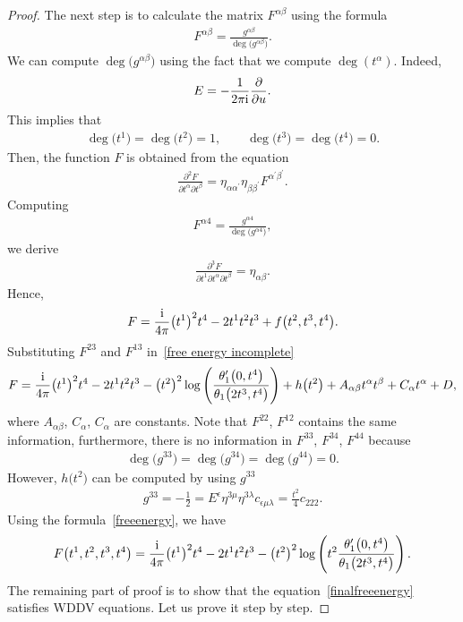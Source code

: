 \documentclass[10pt,a4paper]{amsart}
\numberwithin{equation}{section}
\begin{document}
\begin{proof}
The next step is to calculate the matrix $F^{\alpha\beta}$ using the formula
\begin{gather}\label{Hessian formula}
F^{\alpha\beta}=\frac{g^{\alpha\beta}}{\deg \big( g^{\alpha\beta}\big)}.
\end{gather}
We can compute $\deg \big(g^{\alpha\beta}\big)$ using the fact that we compute $\deg (t^{\alpha})$. Indeed,
\begin{gather*}
E=-\frac{1}{2\pi {\rm i}}\frac{\partial}{\partial u}.
\end{gather*}
This implies that
\begin{gather*}
\deg \big(t^1\big)=\deg \big(t^2\big)=1,
\qquad
\deg \big(t^3\big)=\deg \big(t^4\big)=0.
\end{gather*}
Then, the function $F$ is obtained from the equation
\begin{gather*}
\frac{\partial^2 F}{\partial t^{\alpha}\partial t^{\beta}}=\eta_{\alpha\alpha^{\prime}}\eta_{\beta\beta^{\prime}}F^{\alpha^{\prime}\beta^{\prime}}.
\end{gather*}
Computing
\begin{gather*}
F^{\alpha4}=\frac{g^{\alpha 4}}{\deg \big(g^{\alpha 4}\big)},
\end{gather*}
we derive
\begin{gather*}\label{normalization}
\frac{\partial^3 F}{\partial t^1\partial t^{\alpha}\partial t^{\beta}}=\eta_{\alpha\beta}.
\end{gather*}
Hence,
\begin{gather}\label{free energy incomplete}
F=\frac{\rm i}{4\pi}\big(t^1\big)^2t^4-2t^1t^2t^3+f\big(t^2,t^3,t^4\big).
\end{gather}
Substituting $F^{23}$ and $F^{13}$ in~\eqref{free energy incomplete}
\begin{gather*}
F=\frac{\rm i}{4\pi}\big(t^1\big)^2t^4-2t^1t^2t^3-\big(t^2\big)^2\log \left(\frac{\theta_1^{\prime}\big(0,t^4\big)}{\theta_1\big(2t^3,t^4\big)}\right)+h\big(t^2\big) +A_{\alpha\beta}t^{\alpha}t^{\beta}+C_{\alpha}t^{\alpha}+D,
\end{gather*}
where $A_{\alpha\beta}$, $C_{\alpha}$, $C_{\alpha}$ are constants. Note that $F^{22}$, $F^{12}$ contains the same information, furthermore, there is no information in $F^{33}$, $F^{34}$, $F^{44}$ because
\begin{gather*}
\deg \big(g^{33}\big)=\deg \big(g^{34}\big)=\deg \big(g^{44}\big)=0.
\end{gather*}
However, $h\big(t^2\big)$ can be computed by using $g^{33}$
\begin{gather*}
g^{33}=-\frac{1}{2}=E^{\epsilon}\eta^{3\mu}\eta^{3\lambda}c_{\epsilon\mu\lambda}=\frac{t^2}{4}c_{222}.
\end{gather*}
Using the formula~\eqref{freeenergy}, we have
\begin{gather}\label{finalfreeenergy}
F\big(t^1,t^2,t^3,t^4\big)=\frac{\rm i}{4\pi}\big(t^1\big)^2t^4-2t^1t^2t^3-\big(t^2\big)^2 \log\left(t^2\frac{\theta_1^{\prime}\big(0,t^4\big)}{\theta_1\big(2t^3,t^4\big)}\right).
\end{gather}
The remaining part of proof is to show that the equation~\eqref{finalfreeenergy} satisfies WDDV equations. Let us prove it step by step.


\end{proof}
\end{document}
